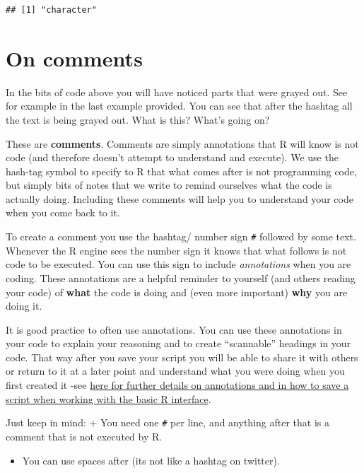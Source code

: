 \documentclass[
]{book}
\providecommand{\tightlist}{%
  \setlength{\itemsep}{0pt}\setlength{\parskip}{0pt}}
\begin{document}
\begin{verbatim}
## [1] "character"
\end{verbatim}

\hypertarget{on-comments}{%
\section{On comments}\label{on-comments}}

In the bits of code above you will have noticed parts that were grayed out. See for example in the last example provided. You can see that after the hashtag all the text is being grayed out. What is this? What's going on?

These are \textbf{comments}. Comments are simply annotations that R will know is not code (and therefore doesn't attempt to understand and execute). We use the hash-tag symbol to specify to R that what comes after is not programming code, but simply bits of notes that we write to remind ourselves what the code is actually doing. Including these comments will help you to understand your code when you come back to it.

To create a comment you use the hashtag/ number sign \texttt{\#} followed by some text. Whenever the R engine sees the number sign it knows that what follows is not code to be executed. You can use this sign to include \emph{annotations} when you are coding. These annotations are a helpful reminder to yourself (and others reading your code) of \textbf{what} the code is doing and (even more important) \textbf{why} you are doing it.

It is good practice to often use annotations. You can use these annotations in your code to explain your reasoning and to create ``scannable'' headings in your code. That way after you save your script you will be able to share it with others or return to it at a later point and understand what you were doing when you first created it -see \href{http://www.screenr.com/1VN8}{here for further details on annotations and in how to save a script when working with the basic R interface}.

Just keep in mind:
+ You need one \texttt{\#} per line, and anything after that is a comment that is not executed by R.

\begin{itemize}
\tightlist
\item
  You can use spaces after (its not like a hashtag on twitter).
\end{itemize}
\end{document}
